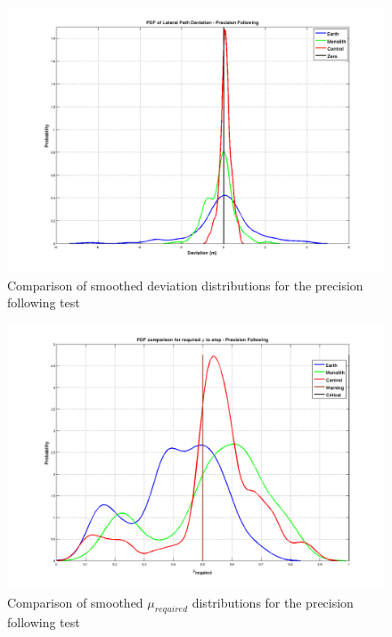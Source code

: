 \begin{figure}[ht] \centering %
    \includegraphics[width=6in]{./figs/precision_following_dev_pdf.png}
    \caption{Comparison of smoothed deviation distributions for the precision following test} \label{fig:precision_dev_dist}
\end{figure}
\begin{figure}[ht] \centering %
    \includegraphics[width=6in]{./figs/precision_following_mu_distribution.png}
    \caption{Comparison of smoothed $\mu_{required}$ distributions for the precision following test} \label{fig:precision_mu_dist}
\end{figure}



